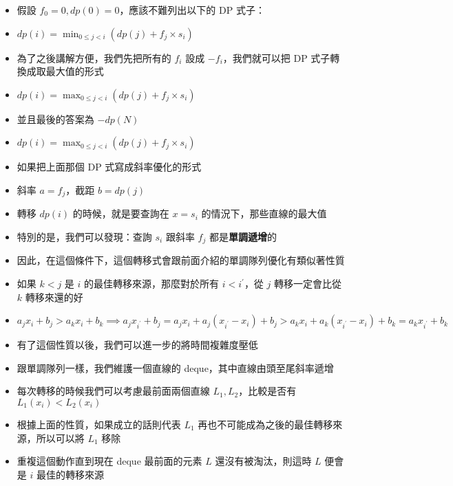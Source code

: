 \documentclass[standalone]{beamer}
\begin{document}
\begin{frame}{}
  \begin{itemize}
    \item 假設 $f_0 = 0, dp(0) = 0$，應該不難列出以下的 DP 式子：
    \item $dp(i) = \min_{0 \leq j < i}(dp(j) + f_j \times s_i)$
    \item 為了之後講解方便，我們先把所有的 $f_i$ 設成 $-f_i$，我們就可以把 DP 式子轉換成取最大值的形式
    \item $dp(i) = \max_{0 \leq j < i}(dp(j) + f_j \times s_i)$
    \item 並且最後的答案為 $-dp(N)$
  \end{itemize}
\end{frame}

\begin{frame}{}
  \begin{itemize}
    \item $dp(i) = \max_{0 \leq j < i}(dp(j) + f_j \times s_i)$
    \item 如果把上面那個 DP 式寫成斜率優化的形式
    \item 斜率 $a = f_j$，截距 $b = dp(j)$
    \item 轉移 $dp(i)$ 的時候，就是要查詢在 $x = s_i$ 的情況下，那些直線的最大值
    \item 特別的是，我們可以發現：查詢 $s_i$ 跟斜率 $f_j$ 都是\textbf{單調遞增}的
  \end{itemize}
\end{frame}

\begin{frame}{}
  \begin{itemize}
    \item 因此，在這個條件下，這個轉移式會跟前面介紹的單調隊列優化有類似著性質
    \item 如果 $k < j$ 是 $i$ 的最佳轉移來源，那麼對於所有 $i < i^\prime$，從 $j$ 轉移一定會比從 $k$ 轉移來還的好
    \item $a_jx_i + b_j > a_kx_i + b_k \implies a_jx_{i^\prime} + b_j = a_jx_i + a_j(x_{i^\prime} - x_i) + b_j > a_kx_i + a_k(x_{i^\prime} - x_i) + b_k = a_kx_{i^\prime} + b_k$
    \item 有了這個性質以後，我們可以進一步的將時間複雜度壓低
  \end{itemize}
\end{frame}

\begin{frame}{}
  \begin{itemize}
    \item 跟單調隊列一樣，我們維護一個直線的 deque，其中直線由頭至尾斜率遞增
    \item 每次轉移的時候我們可以考慮最前面兩個直線 $L_1, L_2$，比較是否有 $L_1(x_i) < L_2(x_i)$
    \item 根據上面的性質，如果成立的話則代表 $L_1$ 再也不可能成為之後的最佳轉移來源，所以可以將 $L_1$ 移除
    \item 重複這個動作直到現在 deque 最前面的元素 $L$ 還沒有被淘汰，則這時 $L$ 便會是 $i$ 最佳的轉移來源
  \end{itemize}
\end{frame}
\end{document}
